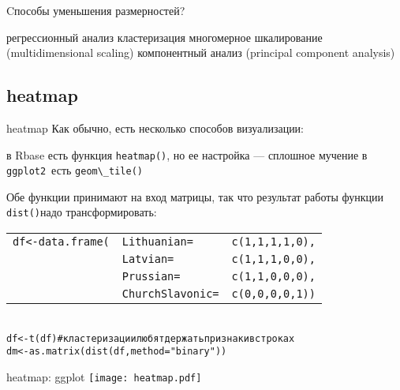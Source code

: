 \begin{frame}{Cпособы уменьшения размерностей?}
\begin{itemize}
\mytem регрессионный анализ
\mytem кластеризация
\mytem многомерное шкалирование (multidimensional scaling)
\mytem компонентный анализ (principal component analysis)
\end{itemize}
\end{frame}
\subsection{heatmap}
\begin{frame}{heatmap}
Как обычно, есть несколько способов визуализации:
\begin{itemize}
\mytem в Rbase есть функция \scriptsize\verb"heatmap()"\normalsize, но ее настройка — сплошное мучение
\mytem в \scriptsize\verb"ggplot2"\normalsize\ есть \scriptsize\verb"geom\_tile()"\normalsize
\end{itemize}
Обе функции принимают на вход матрицы, так что результат работы функции \scriptsize\verb"dist()"\normalsize надо трансформировать:
\scriptsize
\begin{alltt}
\begin{tabular}{lll}
df <- data.frame(& Lithuanian = & c(1, 1, 1, 1, 0), \\ 
 & Latvian = & c(1, 1, 1, 0, 0), \\ 
 & Prussian = & c(1, 1, 0, 0, 0), \\ 
 & ChurchSlavonic = & c(0, 0, 0, 0, 1)) \\ 
\end{tabular}
\\
df <- t(df) \hfill \# кластеризации любят держать признаки в строках\\
dm <- \alert{as.matrix(}dist(df, method = "binary")\alert{)}
\end{alltt}
\normalsize 
\end{frame}
\begin{frame}{heatmap: ggplot}
\texttt{[image: heatmap.pdf]}
\end{frame}
